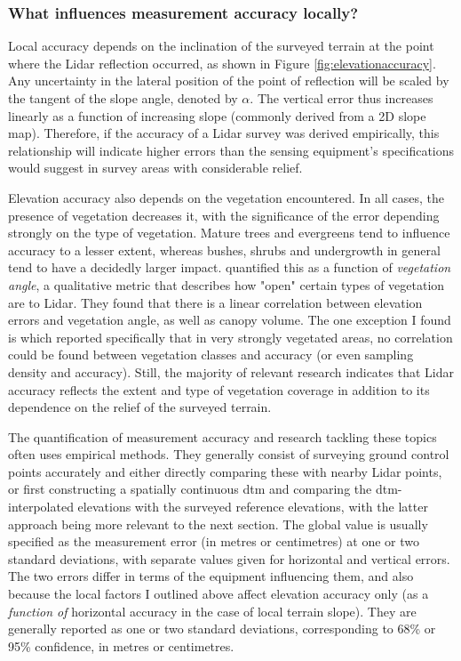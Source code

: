 \subsubsection{What influences measurement accuracy locally?}

Local accuracy depends on the inclination of the surveyed terrain at the point where the Lidar reflection occurred, as shown in Figure \ref{fig:elevationaccuracy}. Any uncertainty in the lateral position of the point of reflection will be scaled by the tangent of the slope angle, denoted by $\alpha$. The vertical error thus increases linearly as a function of increasing slope (commonly derived from a 2D slope map). Therefore, if the accuracy of a Lidar survey was derived empirically, this relationship will indicate higher errors than the sensing equipment's specifications would suggest in survey areas with considerable relief.

Elevation accuracy also depends on the vegetation encountered. In all cases, the presence of vegetation decreases it, with the significance of the error depending strongly on the type of vegetation. Mature trees and evergreens tend to influence accuracy to a lesser extent, whereas bushes, shrubs and undergrowth in general tend to have a decidedly larger impact. \cite{peng_shih_2006} quantified this as a function of \textit{vegetation angle}, a qualitative metric that describes how "open" certain types of vegetation are to Lidar. They found that there is a linear correlation between elevation errors and vegetation angle, as well as canopy volume. The one exception I found is \cite{raber_etal_2007} which reported specifically that in very strongly vegetated areas, no correlation could be found between vegetation classes and accuracy (or even sampling density and accuracy). Still, the majority of relevant research indicates that Lidar accuracy reflects the extent and type of vegetation coverage in addition to its dependence on the relief of the surveyed terrain.

The quantification of measurement accuracy and research tackling these topics often uses empirical methods. They generally consist of surveying ground control points accurately and either directly comparing these with nearby Lidar points, or first constructing a spatially continuous \ac{dtm} and comparing the \ac{dtm}-interpolated elevations with the surveyed reference elevations, with the latter approach being more relevant to the next section. The global value is usually specified as the measurement error (in metres or centimetres) at one or two standard deviations, with separate values given for horizontal and vertical errors. The two errors differ in terms of the equipment influencing them, and also because the local factors I outlined above affect elevation accuracy only (as a \textit{function of} horizontal accuracy in the case of local terrain slope). They are generally reported as one or two standard deviations, corresponding to 68\% or 95\% confidence, in metres or centimetres.

